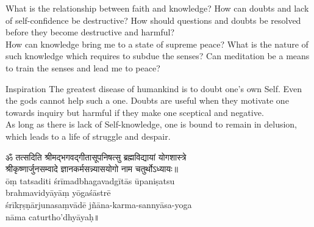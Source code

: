 

\newpage
\begin{mananam}{} 
\mananamtext What is the relationship between faith and knowledge? How can doubts and lack of self-confidence be destructive? How should questions and doubts be resolved before they become destructive and harmful?\\
How can knowledge bring me to a state of supreme peace? What is the nature of such knowledge which requires to subdue the senses? Can meditation be a means to train the senses and lead me to peace?
\end{mananam}
\WritingHand{}
\begin{inspiration}{\mananamfont Inspiration}
\mananamtext The greatest disease of humankind is to doubt one’s own Self. Even the gods cannot help such a one. Doubts are useful when they motivate one towards inquiry but harmful if they make one sceptical and negative.\\
As long as there is lack of Self-knowledge, one is bound to remain in delusion, which leads to a life of struggle and despair. 
\end{inspiration}

\newpage
\begin{center}
  {\devfont ॐ तत्सदिति श्रीमद्भगवद्गीतासूपनिषत्सु ब्रह्मविद्यायां योगशास्त्रे\\
  श्रीकृष्णार्जुनसम्वादे ज्ञानकर्मसन्न्यासयोगो नाम चतुर्थोऽध्यायः॥\\}
  {\notosansdev\color{blue} ōṃ tatsaditi śrīmadbhagavadgītās ūpaniṣatsu \\brahmavidyāyāṃ yōgaśāstrē\\ śrīkṛṣṇārjunasaṃvādē jñāna-karma-sannyāsa-yoga\\nāma caturtho'dhyāyaḥ॥}
\end{center}
\chapEnd

